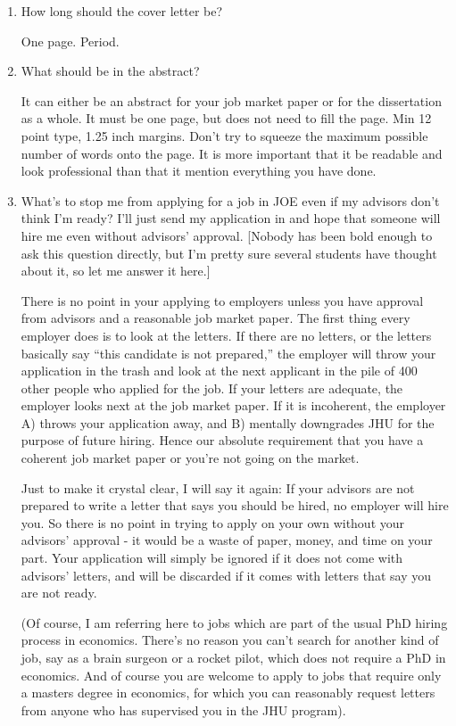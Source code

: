 \documentclass{econtex}
\begin{document}
\begin{enumerate}
\item How long should the cover letter be?

  One page.  Period.

\item What should be in the abstract?

  It can either be an abstract for your job market paper or for the dissertation 
as a whole.  It must be one page, but does not need to fill the page.  Min 12 point
type, 1.25 inch margins.  Don't try to squeeze the maximum possible number of words onto
the page.  It is more important that it be readable and look professional than that 
it mention everything you have done.

\item What's to stop me from applying for a job in JOE even if my advisors don't think I'm ready?  I'll just send 
my application in and hope that someone will hire me even without advisors' approval.  [Nobody 
has been bold enough to ask this question directly, but I'm pretty sure several students have thought about it,
so let me answer it here.]

There is no point in your applying to employers unless you have
approval from advisors and a reasonable job market paper.  The first
thing every employer does is to look at the letters.  If there are no
letters, or the letters basically say ``this candidate is not
prepared,'' the employer will throw your application in the trash and
look at the next applicant in the pile of 400 other people who applied
for the job.  If your letters are adequate, the employer looks next at
the job market paper.  If it is incoherent, the employer A) throws
your application away, and B) mentally downgrades JHU for the purpose
of future hiring.  Hence our absolute requirement that you have a coherent
job market paper or you're not going on the market.

Just to make it crystal clear, I will say it again: If your advisors
are not prepared to write a letter that says you should be hired, no
employer will hire you.  So there is no point in trying to apply on
your own without your advisors' approval - it would be a waste of
paper, money, and time on your part.  Your application will simply be
ignored if it does not come with advisors' letters, and will be discarded
if it comes with letters that say you are not ready.

(Of course, I am referring here to jobs which are part of the usual PhD hiring 
process in economics.  There's no reason you can't search for another kind of 
job, say as a brain surgeon or a rocket pilot, which does not require a 
PhD in economics.  And of course you are welcome to apply to jobs that require 
only a masters degree in economics, for which you can reasonably request letters 
from anyone who has supervised you in the JHU program).  


\end{enumerate}
\end{document}
